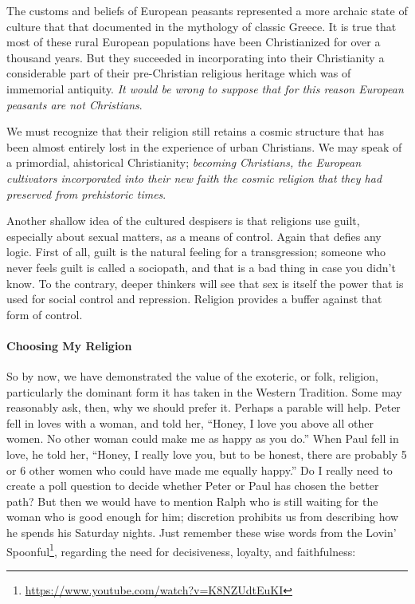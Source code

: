 \begin{quotex}
The customs and beliefs of European peasants represented a more archaic state of culture that that documented in the mythology of classic Greece. It is true that most of these rural European populations have been Christianized for over a thousand years. But they succeeded in incorporating into their Christianity a considerable part of their pre-Christian religious heritage which was of immemorial antiquity. \emph{It would be wrong to suppose that for this reason European peasants are not Christians}.

We must recognize that their religion still retains a cosmic structure that has been almost entirely lost in the experience of urban Christians. We may speak of a primordial, ahistorical Christianity; \emph{becoming Christians, the European cultivators incorporated into their new faith the cosmic religion that they had preserved from prehistoric times}.
\end{quotex}


Another shallow idea of the cultured despisers is that religions use guilt, especially about sexual matters, as a means of control. Again that defies any logic. First of all, guilt is the natural feeling for a transgression; someone who never feels guilt is called a sociopath, and that is a bad thing in case you didn't know. To the contrary, deeper thinkers will see that sex is itself the power that is used for social control and repression. Religion provides a buffer against that form of control.

\paragraph{Choosing My Religion}


So by now, we have demonstrated the value of the exoteric, or folk, religion, particularly the dominant form it has taken in the Western Tradition. Some may reasonably ask, then, why we should prefer it. Perhaps a parable will help. Peter fell in loves with a woman, and told her, ``Honey, I love you above all other women. No other woman could make me as happy as you do.'' When Paul fell in love, he told her, ``Honey, I really love you, but to be honest, there are probably 5 or 6 other women who could have made me equally happy.'' Do I really need to create a poll question to decide whether Peter or Paul has chosen the better path? But then we would have to mention Ralph who is still waiting for the woman who is good enough for him; discretion prohibits us from describing how he spends his Saturday nights. Just remember these wise words from the Lovin' Spoonful\footnote{\url{https://www.youtube.com/watch?v=K8NZUdtEuKI}}, regarding the need for decisiveness, loyalty, and faithfulness:

